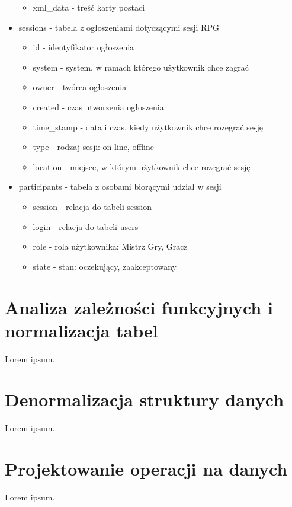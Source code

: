 \begin{itemize}
\begin{itemize}
	\item xml\_data - treść karty postaci
	\end{itemize}
\item sessions - tabela z ogłoszeniami dotyczącymi sesji RPG
	\begin{itemize}
	\item id - identyfikator ogłoszenia
	\item system - system, w ramach którego użytkownik chce zagrać
	\item owner - twórca ogłoszenia
	\item created - czas utworzenia ogłoszenia
	\item time\_stamp - data i czas, kiedy użytkownik chce rozegrać sesję
	\item type - rodzaj sesji: on-line, offline
	\item location - miejsce, w którym użytkownik chce rozegrać sesję
	\end{itemize}
\item participants - tabela z osobami biorącymi udział w sesji
	\begin{itemize}
	\item session - relacja do tabeli session
	\item login - relacja do tabeli users
	\item role - rola użytkownika: Mistrz Gry, Gracz
	\item state - stan: oczekujący, zaakceptowany
	\end{itemize}
\end{itemize}


\section{Analiza zależności funkcyjnych i normalizacja tabel}
\label{sec:normalizacja}

Lorem ipsum.


\section{Denormalizacja struktury danych}
\label{sec:denormalizacja}

Lorem ipsum.


\section{Projektowanie operacji na danych}
\label{sec:operacje}

Lorem ipsum.